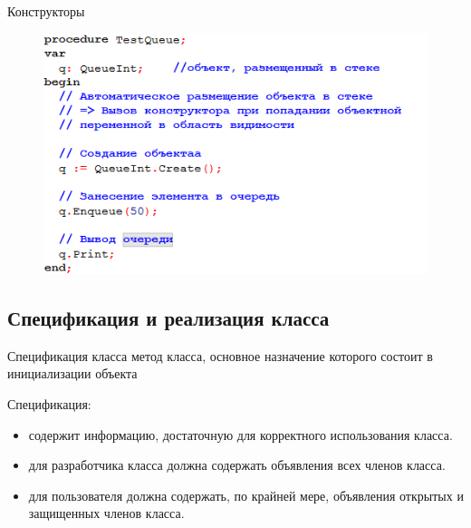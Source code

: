 \documentclass{beamer}
\begin{document}
\begin{frame}{Конструкторы}
\begin{figure}[h]
\centering
\includegraphics[scale=0.6]{images/lec05-pic05.png}
\end{figure}
\end{frame}

\subsection{Спецификация и реализация класса}

\begin{frame}
\begin{block}{Спецификация класса}
метод класса, основное назначение которого состоит в инициализации объекта
\end{block}
Спецификация:
\begin{itemize}
\item содержит информацию, достаточную для корректного использования класса. 
\item для разработчика класса должна содержать объявления всех членов класса. 
\item для пользователя должна содержать, по крайней мере, объявления открытых и защищенных членов класса. 
\end{itemize}
\end{frame}
\end{document}
